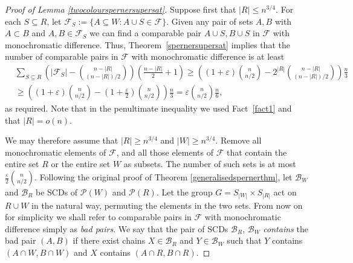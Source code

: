 \documentclass[11pt]{article}
\numberwithin{equation}{section}
\def\eps{\varepsilon}
\begin{document}
\begin{proof}[Proof of Lemma \ref{twocolourspernersupersat}]
Suppose first that $|R|\leq n^{3/4}$. For each $S\subseteq R$, let $\mathcal{F}_S:=\{A\subseteq W: A\cup S\in\mathcal{F}\}$. 
Given any pair of sets $A,B$ with $A \subset B$ and $A,B \in \mathcal F_S$ we can find a comparable pair $A\cup S, B\cup S $ in $\mathcal F$ with monochromatic difference. Thus, Theorem~\ref{spernersupersat} implies that
the number  of comparable pairs in  $\mathcal F$ with monochromatic difference is at least 
\begin{equation*}
\begin{split}
 &  \sum_{S\subseteq R}\left(|\mathcal{F}_S|-\binom{n-|R|}{(n-|R|)/2}\right)\left(\frac{n-|R|}{2}+1\right)\geq \left((1+\eps) \binom{n}{n/2} - 2^{|R|}\binom{n-|R|}{(n-|R|)/2}\right)\frac{n}{3}\\
& \geq \left((1+\eps) \binom{n}{n/2} - \left(1+\frac{\eps}{2}\right) \binom{n}{n/2}\right)\frac{n}{3}=\eps\binom{n}{n/2}\frac{n}{6},
\end{split}
\end{equation*}
as required. Note that in the penultimate inequality we used Fact~\ref{fact1} and that $|R|=o(n)$.


We may therefore assume that $|R|\geq n^{3/4}$ and $|W|\geq n^{3/4}$. Remove all monochromatic elements of $\mathcal{F}$, and all those elements of $\mathcal{F}$ that contain the entire set $R$ or the entire set $W$ as subsets. The number of such sets is at most $\frac{\eps}{2}\binom{n}{n/2}$. Following the original proof of Theorem \ref{generalisedspernerthm}, let $\mathcal{B}_W$ and $\mathcal{B}_R$ be SCDs of $\mathcal{P}(W)$ and $\mathcal{P}(R)$. Let the group $G=S_{|W|}\times S_{|R|}$ act on $R\cup W$ in the natural way, permuting the elements in the two sets. From now on for simplicity we shall refer to comparable pairs in $\mathcal{F}$ with monochromatic difference simply as \emph{bad pairs}. We say that the pair of SCDs $\mathcal{B}_R$, $\mathcal{B}_W$  \emph{contains} the bad pair $(A,B)$ if there exist chains $X\in\mathcal{B}_R$ and $Y\in \mathcal{B}_W$ such that $Y$ contains $(A\cap W, B\cap W)$ and $X$ contains $(A\cap R,B\cap R)$. 


\end{proof}
\end{document}
